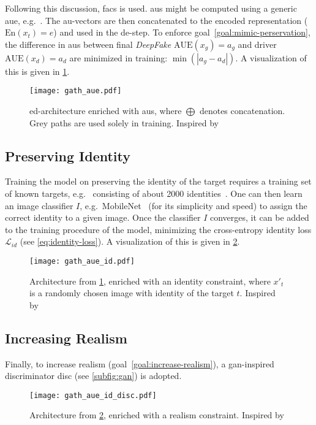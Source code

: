 \par
Following this discussion, \gls{facs} is used. \Glspl{au} might be computed using
a generic \gls{aue}, e.g.\ \cite{Senechal.2015}. The \gls{au}-vectors are then
concatenated to the encoded representation (\(\text{En}(x_t)=e\)) and used in
the \gls{de}-step. To enforce goal~\ref{goal:mimic-perservation}, the difference
in \glspl{au} between final \textit{DeepFake} \(\text{AUE}(x_g)=a_g\) and driver
\(\text{AUE}(x_d)=a_d\) are minimized in training: \(\min{(\left|a_g-a_d\right|)}\).
A visualization of this is given in \cref{fig:gath-aue}.
\begin{figure}[htp]
    \center{}
    \vspace{-1em}
    \texttt{[image: gath\_aue.pdf]}
    \caption{\gls{ed}-architecture enriched with \glspl{au}, where \(\bigoplus\)
    denotes concatenation. Grey paths are used solely in training. Inspired
    by~\cite{Mirsky.2020, Pham.2018}}\label{fig:gath-aue}
    \vspace{-1em}
\end{figure}

\subsection{Preserving Identity}
Training the model on preserving the identity of the target requires a training
set of known targets, e.g.\ \cite{Chen.2015,Cao.2014,Tarres.2011} consisting of 
about 2000 identities~\cite{Pham.2018}. One can then learn an image classifier
\(I\), e.g.\ MobileNet~\cite{Howard.2017} (for its simplicity and speed) to
assign the correct identity to a given image. Once the classifier \(I\)
converges, it can be added to the training procedure of the model, minimizing
the cross-entropy identity loss \(\mathcal{L}_{id}\) (see \cref{eq:identity-loss}).
A visualization of this is given in \cref{fig:gath-aue-id}.
\begin{figure}[htp]
    \vspace{-1em}
    \center{}
    \texttt{[image: gath\_aue\_id.pdf]}
    \caption{Architecture from \cref{fig:gath-aue}, enriched with an identity
    constraint, where \(x'_t\) is a randomly chosen image with identity of the target
    \(t\). Inspired by~\cite{Mirsky.2020, Pham.2018}}\label{fig:gath-aue-id}
    \vspace{-1em}
\end{figure}

\subsection{Increasing Realism}
Finally, to increase realism (goal~\ref{goal:increase-realism}), a \gls{gan}-inspired
discriminator \gls{disc} (see \cref{subfig:gan}) is adopted.
\begin{figure}[htp]
    \vspace{-1em}
    \center{}
    \texttt{[image: gath\_aue\_id\_disc.pdf]}
    \caption{Architecture from \cref{fig:gath-aue-id}, enriched with a realism
    constraint. Inspired by~\cite{Mirsky.2020, Pham.2018}}\label{fig:gath-aue-id-disc}
    \vspace{-1em}
\end{figure}